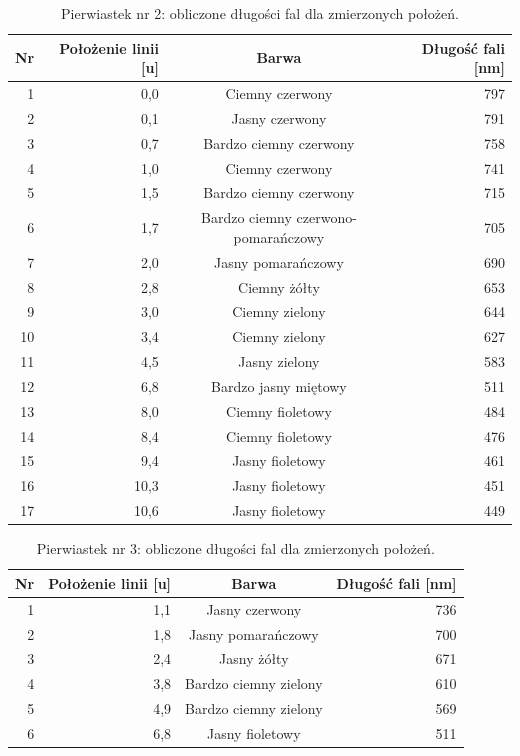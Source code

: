 \documentclass[a4paper,12pt]{article}
\begin{document}
\begin{table}[H]
    \centering
    \begin{tabular}{|r|r|c|r|}
        \hline
        Nr & Położenie linii [u] & Barwa & Długość fali [nm] \\ \hline
        1 & 0{,}0 & Ciemny czerwony & 797 \\ \hline
        2 & 0{,}1 & Jasny czerwony & 791 \\ \hline
        3 & 0{,}7 & Bardzo ciemny czerwony & 758 \\ \hline
        4 & 1{,}0 & Ciemny czerwony & 741 \\ \hline
        5 & 1{,}5 & Bardzo ciemny czerwony & 715 \\ \hline
        6 & 1{,}7 & Bardzo ciemny czerwono-pomarańczowy & 705 \\ \hline
        7 & 2{,}0 & Jasny pomarańczowy & 690 \\ \hline
        8 & 2{,}8 & Ciemny żółty & 653 \\ \hline
        9 & 3{,}0 & Ciemny zielony & 644 \\ \hline
        10 & 3{,}4 & Ciemny zielony & 627 \\ \hline
        11 & 4{,}5 & Jasny zielony & 583 \\ \hline
        12 & 6{,}8 & Bardzo jasny miętowy & 511 \\ \hline
        13 & 8{,}0 & Ciemny fioletowy & 484 \\ \hline
        14 & 8{,}4 & Ciemny fioletowy & 476 \\ \hline
        15 & 9{,}4 & Jasny fioletowy & 461 \\ \hline
        16 & 10{,}3 & Jasny fioletowy & 451 \\ \hline
        17 & 10{,}6 & Jasny fioletowy & 449 \\ \hline
    \end{tabular}
    \caption{Pierwiastek nr 2: obliczone długości fal dla zmierzonych położeń.}
    \label{tab:unknown2}
\end{table}

\begin{table}[H]
    \centering
    \begin{tabular}{|r|r|c|r|}
        \hline
        Nr & Położenie linii [u] & Barwa & Długość fali [nm] \\ \hline
        1 & 1{,}1 & Jasny czerwony & 736 \\ \hline
        2 & 1{,}8 & Jasny pomarańczowy & 700 \\ \hline
        3 & 2{,}4 & Jasny żółty & 671 \\ \hline
        4 & 3{,}8 & Bardzo ciemny zielony & 610 \\ \hline
        5 & 4{,}9 & Bardzo ciemny zielony & 569 \\ \hline
        6 & 6{,}8 & Jasny fioletowy & 511 \\ \hline
    \end{tabular}
    \caption{Pierwiastek nr 3: obliczone długości fal dla zmierzonych położeń.}
    \label{tab:unknown3}
\end{table}
\end{document}
